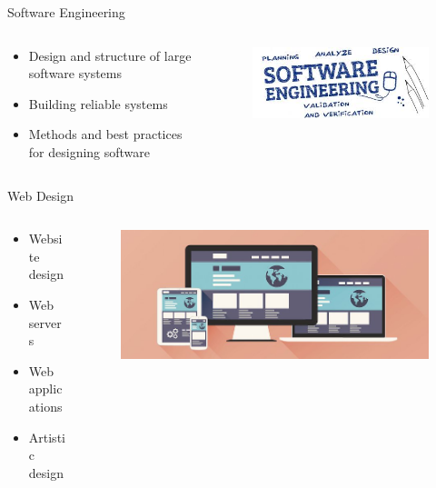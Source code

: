 \documentclass{beamer}
\begin{document}
\begin{frame}{Software Engineering}
\begin{columns}
	\begin{column}{.45\textwidth}
		\begin{itemize}
			\item Design and structure of large software systems
			\item Building reliable systems
			\item Methods and best practices for designing software
		\end{itemize}
	\end{column}
	\begin{column}{.55\textwidth}
		\begin{figure}
			\includegraphics[width=\linewidth]{img/softeng.png}
		\end{figure}
	\end{column}
\end{columns}
\end{frame}

\begin{frame}{Web Design}
\begin{columns}
	\begin{column}{.40\textwidth}
		\begin{itemize}
			\item Website design
			\item Web servers
			\item Web applications
			\item Artistic design
		\end{itemize}
	\end{column}
	\begin{column}{.60\textwidth}
		\begin{figure}
			\includegraphics[width=\linewidth]{img/web.jpg}
		\end{figure}
	\end{column}
\end{columns}
\end{frame}
\end{document}
